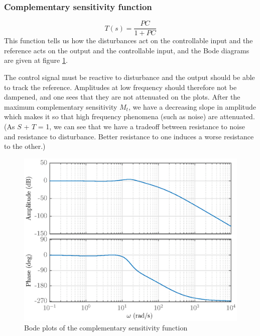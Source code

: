 \subsubsection{Complementary sensitivity function}
$$
T(s) = \dfrac{PC}{1 + PC}
$$
This function tells us how the disturbances act on the controllable input and the reference acts on the output and the controllable input, and the Bode diagrams are given at figure \ref{fig:complementary-sensitivity}.\par
The control signal must be reactive to disturbance and the output should be able to track the reference. Amplitudes at low frequency should therefore not be dampened, and one sees that they are not attenuated on the plots. After the maximum complementary sensitivity $M_t$, we have a decreasing slope in amplitude which makes it so that high frequency phenomena (such as noise) are attenuated. (As $S$ + $T$ = 1, we can see that we have a tradeoff between resistance to noise and resistance to disturbance. Better resistance to one induces a worse resistance to the other.)
\begin{figure}[H]
    \centering
    \includegraphics[scale = 0.8]{resources/eps/4-Val/T.eps}
    \caption{Bode plots of the complementary sensitivity function}
    \label{fig:complementary-sensitivity}
\end{figure}

